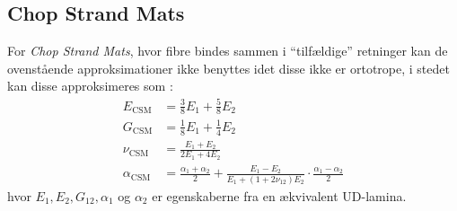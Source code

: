 \subsection{Chop Strand Mats}
For \textit{Chop Strand Mats}, hvor fibre bindes sammen i ``tilfældige'' retninger kan de ovenstående approksimationer ikke benyttes idet disse ikke er ortotrope, i stedet kan disse approksimeres som \cite{lavengood1971stiffnessnonalignedfiber}:
\begin{align*}
  E_{\mathrm{CSM}} &= \frac{3}{8} E_1 + \frac{5}{8} E_2 \\
  G_{\mathrm{CSM}} &= \frac{1}{8} E_1 + \frac{1}{4}E_2 \\
  \nu_{\mathrm{CSM}} &= \frac{E_1 + E_2}{2 E_1 + 4E_2} \\
  \alpha_{\mathrm{CSM}} &= \frac{\alpha_1 + \alpha_2}{2} + \frac{E_1 - E_2}{E_1 + \left( 1 + 2\nu_{12} \right) E_2} \cdot \frac{\alpha_1 - \alpha_2}{2}
\end{align*}
hvor $E_1, E_2, G_{12}, \alpha_1$ og $\alpha_2$ er egenskaberne fra en ækvivalent UD-lamina. 

